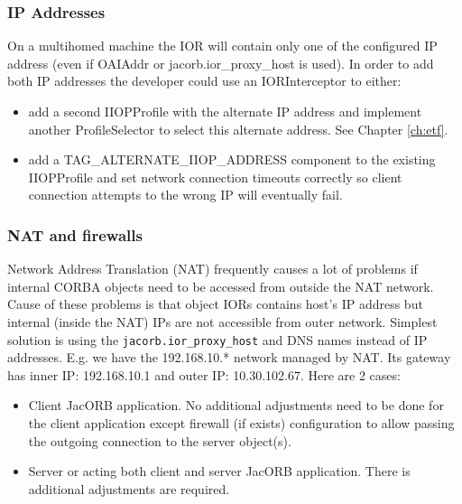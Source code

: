 \subsubsection{IP Addresses}
On a multihomed machine the IOR will contain only one of the configured
IP address (even if OAIAddr or jacorb.ior\_proxy\_host is used). In order to add both IP
addresses the developer could use an IORInterceptor to either:
\begin{itemize}
\item add a second IIOPProfile with the alternate IP address and implement another ProfileSelector to select this alternate address. See Chapter \ref{ch:etf}.
\item add a TAG\_ALTERNATE\_IIOP\_ADDRESS component to the existing IIOPProfile and set network connection timeouts correctly so client connection attempts to the wrong IP will eventually fail.
\end{itemize}


\subsubsection{NAT and firewalls}
Network Address Translation (NAT) frequently causes a lot of problems if internal CORBA objects need to be accessed from outside the NAT network.
Cause of these problems is that object IORs contains host's IP address but internal (inside the NAT) IPs are not accessible from outer network.
Simplest solution is using the {\tt jacorb.ior\_proxy\_host} and DNS names instead of IP addresses.
E.g. we have the 192.168.10.* network managed by NAT. Its gateway has inner IP: 192.168.10.1 and outer IP: 10.30.102.67.
Here are 2 cases:
\begin{itemize}
\item Client JacORB application. No additional adjustments need to be done for the client application except firewall
(if exists) configuration to allow passing the outgoing connection to the server object(s).
\item Server or acting both client and server JacORB application. There is additional adjustments are required.
\end{itemize}

